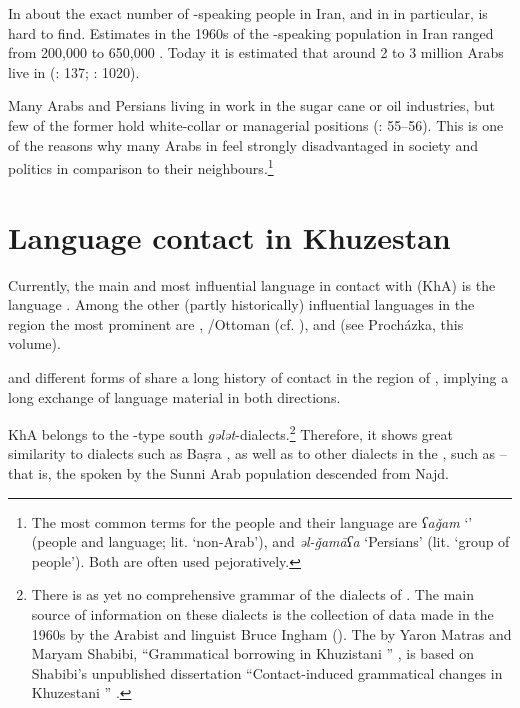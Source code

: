 \documentclass[output=paper,nonflat]{langsci/langscibook}
\begin{document}
In about the exact number of -speaking people in Iran, and in  in particular, is hard to find. Estimates in the 1960s of the -speaking population in Iran ranged from 200,000 to 650,000 \citep[216]{Oberling1986}. Today it is estimated that around 2 to 3 million Arabs live in  (\citealt{MatrasShabibi2007}: 137; \citealt{Gazsi2011}: 1020). 

Many Arabs and Persians living in  work in the sugar cane or oil industries, but few of the former hold white-collar or managerial positions (\citealt{DePlanhol1986}: 55–56). This is one of the reasons why many Arabs in  feel strongly disadvantaged in society and politics in comparison to their  neighbours.\footnote{The most common   terms for the  people and their language are \textit{ʕaǧam} ‘' (people and language; lit. `non-Arab'), and \textit{əl-ǧamāʕa} ‘Persians’ (lit. `group of people'). Both are often used pejoratively.} 

\section{Language contact in Khuzestan}

Currently, the main and most influential language in contact with   (KhA) is the   language . Among the other (partly historically) influential languages in the region the most prominent are , /Ottoman (cf. \citealt{Ingham2005}), and  (see Procházka, this volume).

 and different forms of  share a long history of contact in the region of , implying a long exchange of language material in both directions. 

KhA belongs to the -type south  \textit{gələt}-dialects.\footnote{There is as yet no comprehensive grammar of the dialects of . The main source of information on these dialects is the collection of data made in the 1960s by the Arabist and linguist Bruce Ingham (\citeyear{Ingham1973,Ingham1976,Ingham2011khuz}). The  by Yaron Matras and Maryam Shabibi, “Grammatical borrowing in Khuzistani ” \citep{MatrasShabibi2007}, is based on Shabibi’s unpublished dissertation “Contact-induced grammatical changes in Khuzestani ” \citep{Shabibi2006}.} Therefore, it shows great similarity to  dialects such as Baṣra , as well as to other dialects in the , such as    – that is, the  spoken by the Sunni Arab population descended from Najd. 
\end{document}

